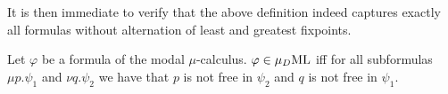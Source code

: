 It is then immediate to verify that the above definition indeed captures exactly all formulas without alternation of least and greatest fixpoints.
\begin{fact}
  Let $\varphi$ be a formula of the modal $\mu$-calculus. $\varphi\in\mu_{D}\mathrm{ML}$ iff for all subformulas $\mu p.\psi_1$ and $\nu q.\psi_2$ we have that $p$ is not free in $\psi_2$ and $q$ is not free in $\psi_1$.
\end{fact}
%
%


